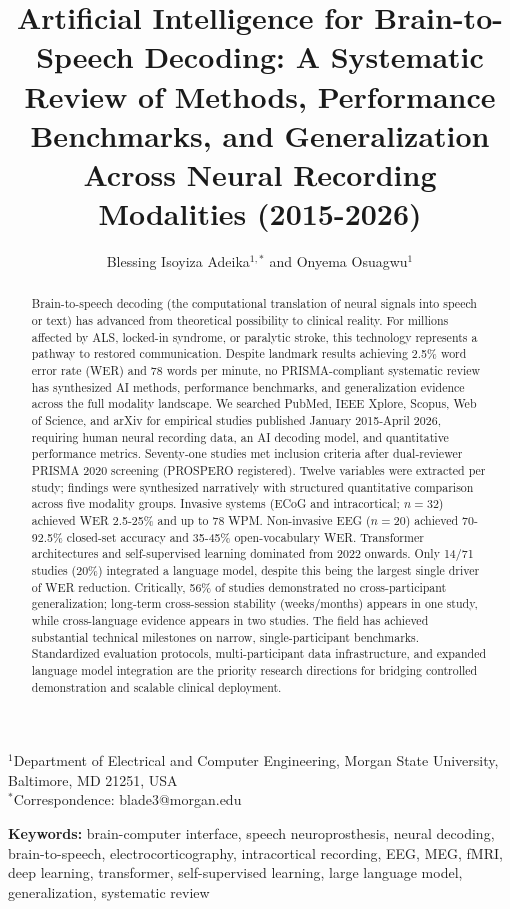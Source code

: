 \documentclass[11pt,a4paper]{article}
\title{Artificial Intelligence for Brain-to-Speech Decoding: A Systematic Review of Methods, Performance Benchmarks, and Generalization Across Neural Recording Modalities (2015-2026)}
\author{Blessing Isoyiza Adeika$^{1,*}$ and Onyema Osuagwu$^{1}$}
\date{}
\makeatletter
\newcommand{\keywords}[1]{\textbf{Keywords:} #1}
\newcommand{\affiliations}{$^{1}$Department of Electrical and Computer Engineering, Morgan State University, Baltimore, MD 21251, USA \\[0.5em] $^{*}$Correspondence: blade3@morgan.edu}
\makeatother
\begin{document}
\maketitle

\noindent\affiliations

\begin{abstract}
Brain-to-speech decoding (the computational translation of neural signals into speech or text) has advanced from theoretical possibility to clinical reality. For millions affected by ALS, locked-in syndrome, or paralytic stroke, this technology represents a pathway to restored communication. Despite landmark results achieving 2.5\% word error rate (WER) and 78 words per minute, no PRISMA-compliant systematic review has synthesized AI methods, performance benchmarks, and generalization evidence across the full modality landscape. We searched PubMed, IEEE Xplore, Scopus, Web of Science, and arXiv for empirical studies published January 2015-April 2026, requiring human neural recording data, an AI decoding model, and quantitative performance metrics. Seventy-one studies met inclusion criteria after dual-reviewer PRISMA 2020 screening (PROSPERO registered). Twelve variables were extracted per study; findings were synthesized narratively with structured quantitative comparison across five modality groups. Invasive systems (ECoG and intracortical; $n=32$) achieved WER 2.5-25\% and up to 78 WPM. Non-invasive EEG ($n=20$) achieved 70-92.5\% closed-set accuracy and 35-45\% open-vocabulary WER. Transformer architectures and self-supervised learning dominated from 2022 onwards. Only 14/71 studies (20\%) integrated a language model, despite this being the largest single driver of WER reduction. Critically, 56\% of studies demonstrated no cross-participant generalization; long-term cross-session stability (weeks/months) appears in one study, while cross-language evidence appears in two studies. The field has achieved substantial technical milestones on narrow, single-participant benchmarks. Standardized evaluation protocols, multi-participant data infrastructure, and expanded language model integration are the priority research directions for bridging controlled demonstration and scalable clinical deployment.
\end{abstract}

\keywords{brain-computer interface, speech neuroprosthesis, neural decoding, brain-to-speech, electrocorticography, intracortical recording, EEG, MEG, fMRI, deep learning, transformer, self-supervised learning, large language model, generalization, systematic review}
\end{document}

